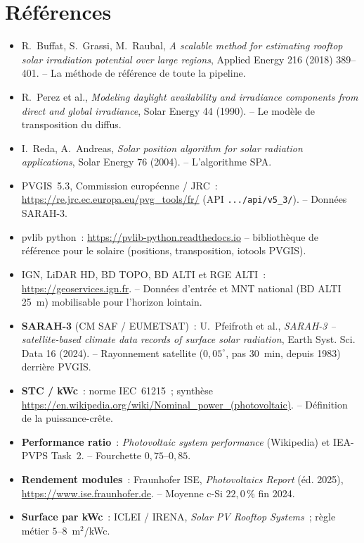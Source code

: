 \documentclass[11pt,a4paper]{article}
\newcommand{\fichier}[1]{\texttt{#1}}
\begin{document}
\section*{Références}

\begin{itemize}
  \item R.~Buffat, S.~Grassi, M.~Raubal, \emph{A scalable method for estimating
    rooftop solar irradiation potential over large regions}, Applied Energy 216
    (2018) 389--401. -- La méthode de référence de toute la pipeline.
  \item R.~Perez et al., \emph{Modeling daylight availability and irradiance
    components from direct and global irradiance}, Solar Energy 44 (1990). --
    Le modèle de transposition du diffus.
  \item I.~Reda, A.~Andreas, \emph{Solar position algorithm for solar radiation
    applications}, Solar Energy 76 (2004). -- L'algorithme SPA.
  \item PVGIS~5.3, Commission européenne / JRC~:
    \url{https://re.jrc.ec.europa.eu/pvg_tools/fr/} (API \fichier{.../api/v5\_3/}).
    -- Données SARAH-3.
  \item pvlib python~: \url{https://pvlib-python.readthedocs.io} --
    bibliothèque de référence pour le solaire (positions, transposition,
    iotools PVGIS).
  \item IGN, LiDAR HD, BD TOPO, BD ALTI et RGE ALTI~:
    \url{https://geoservices.ign.fr}. -- Données d'entrée et MNT national
    (BD ALTI 25~m) mobilisable pour l'horizon lointain.
  \item \textbf{SARAH-3} (CM SAF / EUMETSAT)~: U.~Pfeifroth et al.,
    \emph{SARAH-3 -- satellite-based climate data records of surface solar
    radiation}, Earth Syst. Sci. Data 16 (2024). -- Rayonnement satellite
    ($0{,}05^\circ$, pas 30~min, depuis 1983) derrière PVGIS.
  \item \textbf{STC / kWc}~: norme IEC~61215~; synthèse
    \url{https://en.wikipedia.org/wiki/Nominal_power_(photovoltaic)}. -- Définition
    de la puissance-crête.
  \item \textbf{Performance ratio}~: \emph{Photovoltaic system performance}
    (Wikipedia) et IEA-PVPS Task~2. -- Fourchette $0{,}75$--$0{,}85$.
  \item \textbf{Rendement modules}~: Fraunhofer ISE, \emph{Photovoltaics Report}
    (éd. 2025), \url{https://www.ise.fraunhofer.de}. -- Moyenne c-Si
    $22{,}0\,\%$ fin 2024.
  \item \textbf{Surface par kWc}~: ICLEI / IRENA, \emph{Solar PV Rooftop Systems}~;
    règle métier $5$--$8$~m$^2$/kWc.
\end{itemize}
\end{document}
